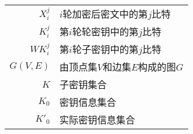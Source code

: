 \begin{symbollist}
\label{chap:symb}

\begin{longtable}{rl}
 $X^j_i$ & $i$轮加密后密文中的第$j$比特 \\
 $K^j_i$ & 第$i$轮轮密钥中的第$j$比特 \\
 $WK^j_i$ & 第$i$轮子密钥中的第$j$比特 \\
 $G(V,E)$ & 由顶点集$V$和边集$E$构成的图$G$ \\
 $K$ & 子密钥集合 \\
 $K_0$ & 密钥信息集合 \\
 $K'_0$ & 实际密钥信息集合 \\
\end{longtable}
\end{symbollist}
